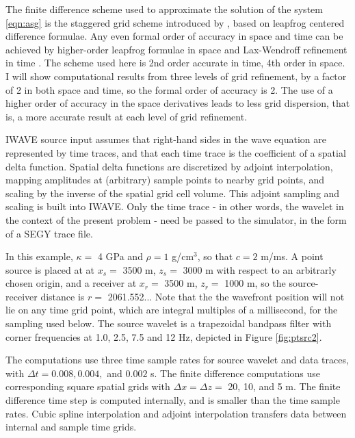The finite difference scheme used to approximate the solution of the
system \ref{eqn:asg}
is the staggered grid scheme
introduced by \cite{GauTarVir:86}, based on leapfrog centered
difference formulae. Any even formal order of accuracy in space and
time can be achieved by higher-order leapfrog formulae in space and
Lax-Wendroff refinement in time \cite[]{moczoetal:06}. The scheme used
here is 2nd order accurate in time, 4th order in space. I will show
computational results from three levels of grid refinement, by a
factor of 2 in both space and time, so the formal order of accuracy is
2. The use of a higher order of accuracy in the space derivatives
leads to less grid dispersion, that is, a more accurate result at each
level of grid refinement.

IWAVE source input assumes that right-hand sides in the wave equation
are represented by time traces, and that each time trace is the
coefficient of a spatial delta function. Spatial delta functions are
discretized by adjoint interpolation, mapping amplitudes at
(arbitrary) sample points
to nearby grid points, and scaling by the inverse of the spatial grid
cell volume. This adjoint sampling and scaling is built into
IWAVE. Only the time trace - in other words, the wavelet in the
context of the present problem - need be passed to the simulator, in
the form of a SEGY trace file.

In this example, $\kappa = $ 4 GPa and $\rho = 1$ g/cm$^3$, so that $c = 2$
m/ms. A point source is placed at at $x_s=$ 3500 m, $z_s=$ 3000 m with
respect to an arbitrarly chosen origin, and a receiver at $x_r=$ 3500
m, $z_r=$ 1000 m, so the source-receiver distance is $r=$
2061.552... Note that the the wavefront position will not lie on any
time grid point, which are integral multiples of a
millisecond, for the sampling used below.
The source wavelet is a trapezoidal bandpass filter
with corner frequencies at 1.0, 2.5, 7.5 and 12 Hz, depicted in Figure
\ref{fig:ptsrc2}.


The computations use three time sample rates for source wavelet and
data traces, with $\Delta t = 0.008, 0.004, $ and
$0.002$ s. The finite difference computations use corresponding square spatial grids
with $\Delta x = \Delta z = $ 20, 10, and 5 m. The finite difference 
time step is computed internally, and is smaller than the time sample
rates. Cubic spline interpolation and adjoint interpolation
transfers data between internal and sample time grids.

